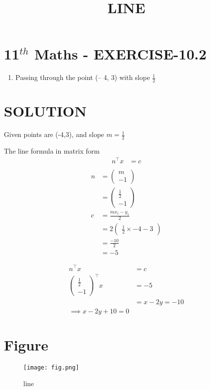 \documentclass[12pt]{article}
\newcommand{\myvec}[1]{\ensuremath{\begin{pmatrix}#1\end{pmatrix}}}
\begin{document}
\begin{center}
\title{\textbf{LINE}}
\date{\vspace{-5ex}} %
\maketitle
\end{center}

\section{11$^{th}$ Maths - EXERCISE-10.2}
\begin{enumerate}
\item Passing through the point (– 4, 3) with slope $\frac{1}{2}$
\end{enumerate}
\section{SOLUTION}
Given points are (-4,3), and slope $m=\frac{1}{2}$

The line formula in matrix form
\begin{align}
n^\top x&=c\\
\end{align}
\begin{align}
n&=\myvec{m\\-1}\\
&=\myvec{\frac{1}{2}\\-1}\\
c&=\frac{mx_1-y_1}{2}\\
&=2 \myvec{\frac{1}{2}\times-4-3}\\
&=\frac{-10}{2}\\
&=-5
\end{align}

\begin{align}
n^\top x&=c\\
\myvec{\frac{1}{2}\\-1}^\top x&=-5\\
&=x-2y=-10\\
\implies x-2y+10=0
\end{align} 
\section{Figure}
\begin{figure}[h]
\texttt{[image: fig.png]}
\caption{line}
		\label{fig:Figure}
\end{figure}
\end{document}
